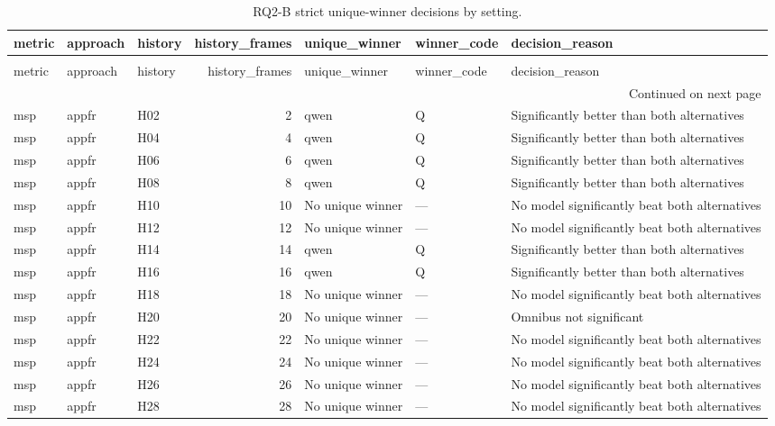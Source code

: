 \begin{longtable}{lllrlll}
\caption{RQ2-B strict unique-winner decisions by setting.} \label{tab:rq2b-model-winners-by-history} \\
\toprule
metric & approach & history & history\_frames & unique\_winner & winner\_code & decision\_reason \\
\midrule
\endfirsthead
\caption[]{RQ2-B strict unique-winner decisions by setting.} \\
\toprule
metric & approach & history & history\_frames & unique\_winner & winner\_code & decision\_reason \\
\midrule
\endhead
\midrule
\multicolumn{7}{r}{Continued on next page} \\
\midrule
\endfoot
\bottomrule
\endlastfoot
msp & appfr & H02 & 2 & qwen & Q & Significantly better than both alternatives \\
msp & appfr & H04 & 4 & qwen & Q & Significantly better than both alternatives \\
msp & appfr & H06 & 6 & qwen & Q & Significantly better than both alternatives \\
msp & appfr & H08 & 8 & qwen & Q & Significantly better than both alternatives \\
msp & appfr & H10 & 10 & No unique winner & — & No model significantly beat both alternatives \\
msp & appfr & H12 & 12 & No unique winner & — & No model significantly beat both alternatives \\
msp & appfr & H14 & 14 & qwen & Q & Significantly better than both alternatives \\
msp & appfr & H16 & 16 & qwen & Q & Significantly better than both alternatives \\
msp & appfr & H18 & 18 & No unique winner & — & No model significantly beat both alternatives \\
msp & appfr & H20 & 20 & No unique winner & — & Omnibus not significant \\
msp & appfr & H22 & 22 & No unique winner & — & No model significantly beat both alternatives \\
msp & appfr & H24 & 24 & No unique winner & — & No model significantly beat both alternatives \\
msp & appfr & H26 & 26 & No unique winner & — & No model significantly beat both alternatives \\
msp & appfr & H28 & 28 & No unique winner & — & No model significantly beat both alternatives \\

\end{longtable}
